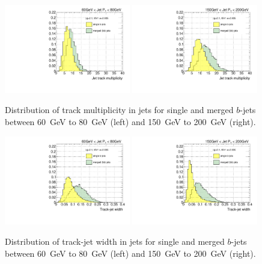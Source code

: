 \begin{figure}[tp]
\centering
\includegraphics[width=0.49\textwidth]{FIGS/VarsSingleMerged/Ntrk060.pdf}
\includegraphics[width=0.49\textwidth]{FIGS/VarsSingleMerged/Ntrk150.pdf}
\caption{Distribution of track multiplicity in jets for single and merged $b$-jets between 60~GeV to 80~GeV (left) and 150~GeV to 200~GeV (right).}
\label{fig:ntrksinglemerged}
\end{figure}

\begin{figure}[tp]
\centering
\includegraphics[width=0.49\textwidth]{FIGS/VarsSingleMerged/trkWidth060.pdf}
\includegraphics[width=0.49\textwidth]{FIGS/VarsSingleMerged/trkWidth150.pdf}
\caption{Distribution of track-jet width in jets for single and merged $b$-jets between 60~GeV to 80~GeV (left) and 150~GeV to 200~GeV (right).}
\label{fig:trkwidthsinglemerged}
\end{figure}


